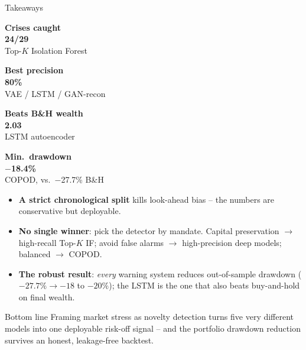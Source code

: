 \documentclass[10pt,aspectratio=169]{beamer}
\newcommand{\metriccard}[3]{%
	\begin{minipage}[t]{0.23\textwidth}
		\textcolor{accent}{\scriptsize\textbf{#1}}\\[-0.1em]
		{\Large\textbf{#2}}\\[-0.2em]
		{\scriptsize #3}
	\end{minipage}%
}
\begin{document}
\begin{frame}{Takeaways}
	\metriccard{Crises caught}{24/29}{Top-$K$ Isolation Forest}
	\hfill
	\metriccard{Best precision}{80\%}{VAE / LSTM / GAN-recon}
	\hfill
	\metriccard{Beats B\&H wealth}{2.03}{LSTM autoencoder}
	\hfill
	\metriccard{Min.\ drawdown}{$-$18.4\%}{COPOD, vs.\ $-$27.7\% B\&H}

	\vspace{0.8em}
	\begin{itemize}
		\item \textbf{A strict chronological split} kills look-ahead bias -- the numbers
		      are conservative but deployable.
		\item \textbf{No single winner}: pick the detector by mandate.
		      Capital preservation $\to$ high-recall Top-$K$ IF; avoid false alarms
		      $\to$ high-precision deep models; balanced $\to$ COPOD.
		\item \textbf{The robust result}: \emph{every} warning system reduces out-of-sample
		      drawdown ($-27.7\%\to-18$ to $-20\%$); the LSTM is the one that also beats
		      buy-and-hold on final wealth.
	\end{itemize}
	\begin{alertblock}{Bottom line}
		Framing market stress as novelty detection turns five very different models into
		one deployable risk-off signal -- and the portfolio drawdown reduction survives an
		honest, leakage-free backtest.
	\end{alertblock}
\end{frame}
\end{document}
